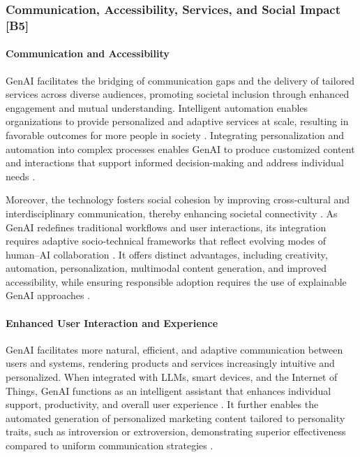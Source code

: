 \subsubsection{Communication, Accessibility, Services, and Social Impact [B5]}
\paragraph{Communication and Accessibility}
GenAI facilitates the bridging of communication gaps and the delivery of tailored services across diverse audiences, promoting societal inclusion through enhanced engagement and mutual understanding. Intelligent automation enables organizations to provide personalized and adaptive services at scale, resulting in favorable outcomes for more people in society \parencite{R08}. Integrating personalization and automation into complex processes enables GenAI to produce customized content and interactions that support informed decision-making and address individual needs \parencite{R09,S09}.

Moreover, the technology fosters social cohesion by improving cross-cultural and interdisciplinary communication, thereby enhancing societal connectivity \parencite{S09}. As GenAI redefines traditional workflows and user interactions, its integration requires adaptive socio-technical frameworks that reflect evolving modes of human–AI collaboration \parencite{S13}. It offers distinct advantages, including creativity, automation, personalization, multimodal content generation, and improved accessibility, while ensuring responsible adoption requires the use of explainable GenAI approaches \parencite{S18}.

\paragraph{Enhanced User Interaction and Experience}

GenAI facilitates more natural, efficient, and adaptive communication between users and systems, rendering products and services increasingly intuitive and personalized. When integrated with LLMs, smart devices, and the Internet of Things, GenAI functions as an intelligent assistant that enhances individual support, productivity, and overall user experience \parencite{R02}. It further enables the automated generation of personalized marketing content tailored to personality traits, such as introversion or extroversion, demonstrating superior effectiveness compared to uniform communication strategies \parencite{R04}.


